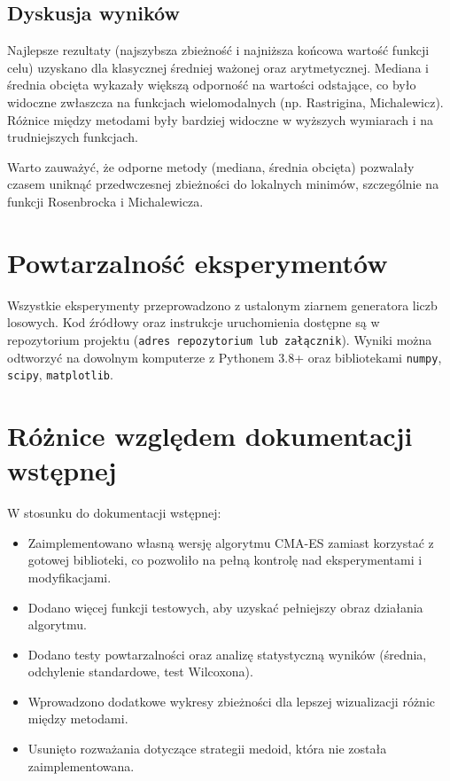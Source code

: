 \documentclass{article}
\begin{document}
\subsection{Dyskusja wyników}
Najlepsze rezultaty (najszybsza zbieżność i najniższa końcowa wartość funkcji celu) uzyskano dla klasycznej średniej ważonej oraz arytmetycznej. Mediana i średnia obcięta wykazały większą odporność na wartości odstające, co było widoczne zwłaszcza na funkcjach wielomodalnych (np. Rastrigina, Michalewicz). Różnice między metodami były bardziej widoczne w wyższych wymiarach i na trudniejszych funkcjach.

Warto zauważyć, że odporne metody (mediana, średnia obcięta) pozwalały czasem uniknąć przedwczesnej zbieżności do lokalnych minimów, szczególnie na funkcji Rosenbrocka i Michalewicza.

\section{Powtarzalność eksperymentów}
Wszystkie eksperymenty przeprowadzono z ustalonym ziarnem generatora liczb losowych. Kod źródłowy oraz instrukcje uruchomienia dostępne są w repozytorium projektu (\texttt{adres repozytorium lub załącznik}). Wyniki można odtworzyć na dowolnym komputerze z Pythonem 3.8+ oraz bibliotekami \texttt{numpy}, \texttt{scipy}, \texttt{matplotlib}.

\section{Różnice względem dokumentacji wstępnej}
W stosunku do dokumentacji wstępnej:
\begin{itemize}
    \item Zaimplementowano własną wersję algorytmu CMA-ES zamiast korzystać z gotowej biblioteki, co pozwoliło na pełną kontrolę nad eksperymentami i modyfikacjami.
    \item Dodano więcej funkcji testowych, aby uzyskać pełniejszy obraz działania algorytmu.
    \item Dodano testy powtarzalności oraz analizę statystyczną wyników (średnia, odchylenie standardowe, test Wilcoxona).
    \item Wprowadzono dodatkowe wykresy zbieżności dla lepszej wizualizacji różnic między metodami.
    \item Usunięto rozważania dotyczące strategii medoid, która nie została zaimplementowana.
\end{itemize}
\end{document}
